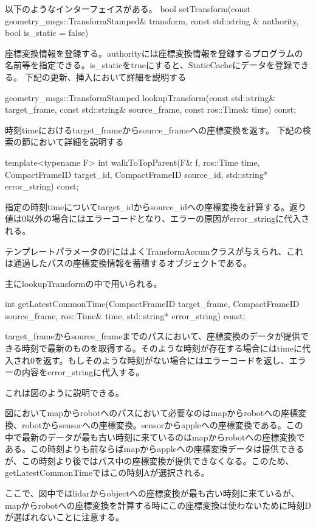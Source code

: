 \documentclass[a4paper]{jreport}	%
\begin{document}
以下のようなインターフェイスがある。
bool setTransform(const geometry\_msgs::TransformStamped\& transform, const std::string \& authority, bool is\_static = false)

座標変換情報を登録する。authorityには座標変換情報を登録するプログラムの名前等を指定できる。is\_staticをtrueにすると、StaticCacheにデータを登録できる。
下記の更新、挿入において詳細を説明する

geometry\_msgs::TransformStamped lookupTransform(const std::string\& target\_frame, const std::string\& source\_frame, const ros::Time\& time) const;
		   
時刻timeにおけるtarget\_frameからsource\_frameへの座標変換を返す。
下記の検索の節において詳細を説明する


template<typename F> int walkToTopParent(F\& f, ros::Time time, CompactFrameID target\_id, CompactFrameID source\_id, std::string* error\_string) const;


指定の時刻timeについてtarget\_idからsource\_idへの座標変換を計算する。返り値は0以外の場合にはエラーコードとなり、エラーの原因がerror\_stringに代入される。

テンプレートパラメータのFにはよくTransformAccumクラスが与えられ、これは通過したパスの座標変換情報を蓄積するオブジェクトである。

主にlookupTransformの中で用いられる。

int getLatestCommonTime(CompactFrameID target\_frame, CompactFrameID source\_frame, ros::Time\& time, std::string* error\_string) const;

target\_frameからsource\_frameまでのパスにおいて、座標変換のデータが提供できる時刻で最新のものを取得する。そのような時刻が存在する場合にはtimeに代入され0を返す。もしそのような時刻がない場合にはエラーコードを返し、エラーの内容をerror\_stringに代入する。

これは図のように説明できる。

図においてmapからrobotへのパスにおいて必要なのはmapからrobotへの座標変換、robotからsensorへの座標変換。sensorからappleへの座標変換である。この中で最新のデータが最も古い時刻に来ているのはmapからrobotへの座標変換である。この時刻よりも前ならばmapからappleへの座標変換データは提供できるが、この時刻より後ではパス中の座標変換が提供できなくなる。このため、getLatestCommonTimeではこの時刻Aが選択される。

ここで、図中ではlidarからobjectへの座標変換が最も古い時刻に来ているが、mapからrobotへの座標変換を計算する時にこの座標変換は使わないために時刻Dが選ばれないことに注意する。
\end{document}
